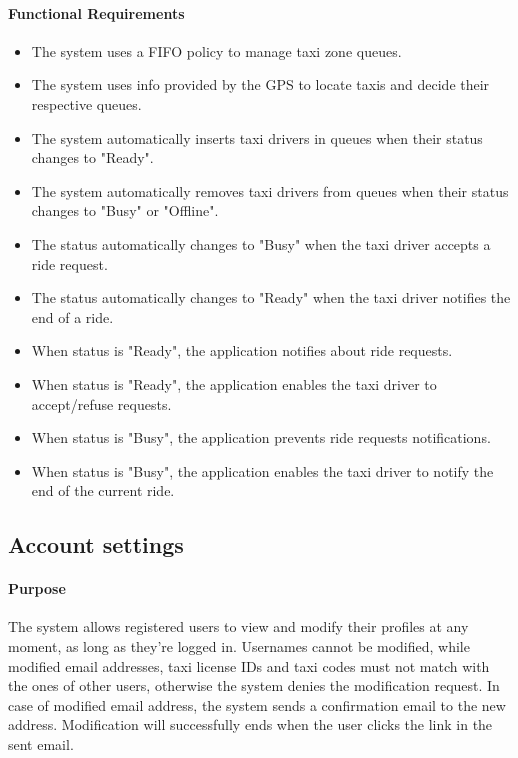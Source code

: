 	\paragraph{Functional Requirements}
		\begin{itemize}
			\item The system uses a FIFO policy to manage taxi zone queues.
			\item The system uses info provided by the GPS to locate taxis and decide their respective queues.
			\item The system automatically inserts taxi drivers in queues when their status changes to "Ready".
			\item The system automatically removes taxi drivers from queues when their status changes to "Busy" or "Offline".
			\item The status automatically changes to "Busy" when the taxi driver accepts a ride request.
			\item The status automatically changes to "Ready" when the taxi driver notifies the end of a ride.
			\item When status is "Ready", the application notifies about ride requests.
			\item When status is "Ready", the application enables the taxi driver to accept/refuse requests.
			\item When status is "Busy", the application prevents ride requests notifications.
			\item When status is "Busy", the application enables the taxi driver to notify the end of the current ride.
		\end{itemize}

\subsection{Account settings}
	\paragraph{Purpose}
		The system allows registered users to view and modify their profiles at any moment, as long as they're logged in. Usernames cannot be modified, while modified email addresses, taxi license IDs and taxi codes must not match with the ones of other users, otherwise the system denies the modification request. In case of modified email address, the system sends a confirmation email to the new address. Modification will successfully ends when the user clicks the link in the sent email.
	
